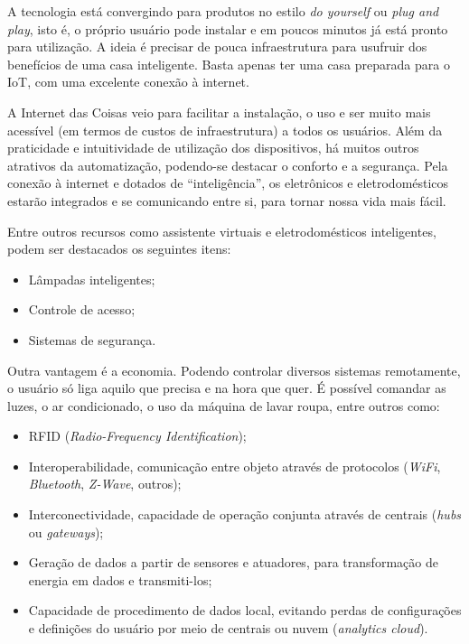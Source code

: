 \documentclass[
12pt,
openany, %
oneside, %
a4paper,			
english,			
brazil			        %
]{abntbibufjf}
\begin{document}
    A tecnologia está convergindo para produtos no estilo \textit{do yourself} ou \textit{plug and play}, isto é, o próprio usuário pode instalar e em poucos minutos já está pronto para utilização. A ideia é precisar de pouca infraestrutura para usufruir dos benefícios de uma casa inteligente. Basta apenas ter uma casa preparada para o IoT, com uma excelente conexão à internet.
    
    A Internet das Coisas veio para facilitar a instalação, o uso e ser muito mais acessível (em termos de custos de infraestrutura) a todos os usuários. Além da praticidade e intuitividade de utilização dos dispositivos, há muitos outros atrativos da automatização, podendo-se destacar o conforto e a segurança. Pela conexão à internet e dotados de “inteligência”, os eletrônicos e eletrodomésticos estarão integrados e se comunicando entre si, para tornar nossa vida mais fácil.

    Entre outros recursos como assistente virtuais e eletrodomésticos inteligentes, podem ser destacados os seguintes itens:

\begin{itemize}
    \item Lâmpadas inteligentes;
    \item Controle de acesso;
    \item Sistemas de segurança.
\end{itemize}

    Outra vantagem é a economia. Podendo controlar diversos sistemas remotamente, o usuário só liga aquilo que precisa e na hora que quer. É possível comandar as luzes, o ar condicionado, o uso da máquina de lavar roupa, entre outros como:

\begin{itemize}
    \item RFID (\textit{Radio-Frequency Identification});

    \item Interoperabilidade, comunicação entre objeto através de protocolos (\textit{WiFi}, \textit{Bluetooth}, \textit{Z-Wave}, outros);

    \item Interconectividade, capacidade de operação conjunta através de centrais (\textit{hubs} ou \textit{gateways});

    \item Geração de dados a partir de sensores e atuadores, para transformação de energia em dados e transmiti-los;

    \item Capacidade de procedimento de dados local, evitando perdas de configurações e definições do usuário por meio de centrais ou nuvem (\textit{analytics cloud}).

\end{itemize}
\end{document}
